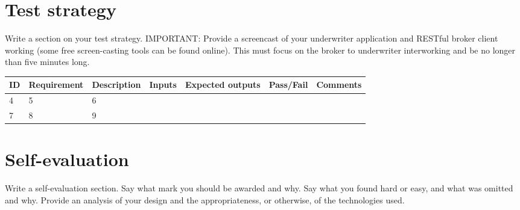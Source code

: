 \documentclass[10pt,a4paper,headinclude=true,twoside]{report}
\begin{document}
\section{Test strategy}
Write a section on your test strategy. IMPORTANT: Provide a
screencast of your underwriter application and RESTful broker client
working (some free screen-casting tools can be found online). This
must focus on the broker to underwriter interworking and be no longer
than five minutes long.

\begin{center}
\begin{tabular}{ p{0.2cm} | l | l | l | l | l | l }
   \hline                        
   ID &  Requirement & Description &  Inputs   &  Expected outputs & Pass/Fail & Comments  \\ \hline
   4 & 5 & 6 \\ \hline
   7 & 8 & 9 \\ 
   \hline  
\end{tabular}
\end{center}
\section{Self-evaluation}
Write a self-evaluation section. Say what mark you should be awarded
and why. Say what you found hard or easy, and what was omitted and
why. Provide an analysis of your design and the appropriateness, or
otherwise, of the technologies used.



\end{document}
